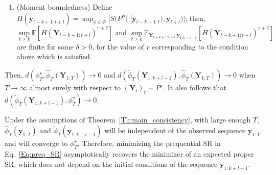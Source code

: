 \documentclass[twoside,11pt]{article}
\newcommand{\E}{\mathbb{E}}
\newcommand{\ddobs}{\mathbf{y}}
\newcommand{\Ddobs}{\mathbf{Y}}
\newcommand{\ddobsupkplusl}{\mathbf{y}_{1:k+l-1}}
\newcommand{\Ddobsupkplusl}{\mathbf{Y}_{1:k+l-1}}
\newcommand{\ddobsupT}{\mathbf{y}_{1:T}}
\begin{document}
\begin{theorem}
\begin{enumerate}
\begin{enumerate}
				\begin{enumerate}
					\item $ \alpha $-mixing with mixing coefficient of size $ r/(2r-1) $, with $ r \ge 1 $, or
					\item $ \varphi $-mixing with mixing coefficient of size $ r/(r-1) $ with $ r > 1 $.
				\end{enumerate}
				\item (Moment boundedness) Define $ H(\ddobs_{t-k+1:t+l}) = \sup_{\phi \in \Phi } |S(P^\phi(\cdot|\ddobs_{t-k+1:t}), \ddobs_{t+l})| $; then, $$ \sup_{t\ge k} \E\left[H(\Ddobs_{t-k+1:t+l})^{r+\delta}\right]  \text{ and } \sup_{t\ge k} \E_{\Ddobs_{t-k+1:t+l}|\ddobsupkplusl}\left[H(\Ddobs_{t-k+1:t+l})^{r+\delta}\right] $$ are finite for some $ \delta>0 $, for the value of $ r $ corresponding to the condition above which is satisfied.
			\end{enumerate}
		\end{enumerate}
		Then, $ d(\phi^\star_T , \hat \phi_T(\Ddobs_{1:T})) \to 0$ and  $d(\tilde\phi_T(\Ddobsupkplusl) , \hat \phi_T(\Ddobs_{1:T})) \to 0 $ when $ T\to\infty $ almost surely with respect to $ (\Ddobs_t)_t \sim P^\star $. 
		It also follows that $ d(\tilde\phi_T(\Ddobsupkplusl) , \phi^\star_T) \to 0 $.
	\end{theorem}
	
	Under the assumptions of Theorem~\ref{Th:main_consistency}, with large enough $ T $, $ \hat{\phi}_T(\ddobsupT) $ and $ \tilde \phi_T(\ddobs_{1:k+l-1}) $ will be independent of the observed sequence $ \ddobsupT $ and will converge to $ \phi^\star_T $. Therefore, minimizing the prequential SR in Eq.~\eqref{Eq:preq_SR} asymptotically recovers the minimizer of an expected proper SR, which does not depend on the initial conditions of the sequence $ \ddobsupkplusl $.
	
\end{document}
